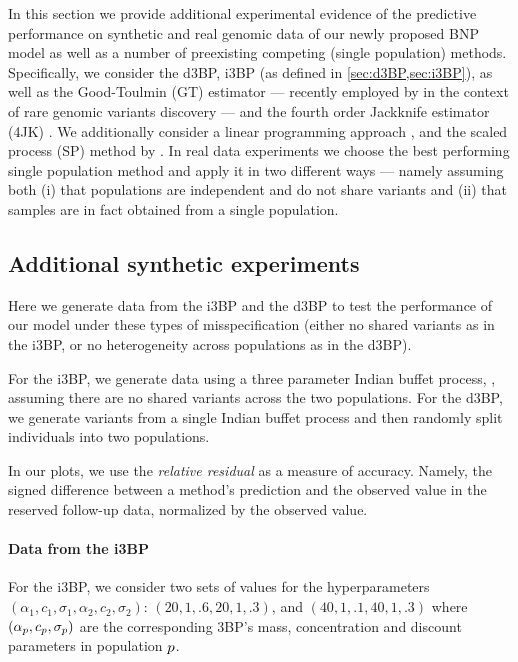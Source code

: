 
In this section we provide additional experimental evidence of the predictive performance on synthetic and real genomic data of our newly proposed BNP model as well as a number of preexisting competing (single population) methods.
Specifically, we consider the d3BP, i3BP (as defined in \cref{sec:d3BP,sec:i3BP}), as well as the Good-Toulmin (GT) estimator --- recently employed by \citet{chakraborty2019using} in the context of rare genomic variants discovery --- and the fourth order Jackknife estimator (4JK) \citet{gravel2014predicting}. We additionally consider a linear programming approach \citep[LP]{zou2016quantifying}, and the scaled process (SP) method by \citet{Camerlenghi2021}. In real data experiments we choose the best performing single population method and apply it in two different ways --- namely assuming both (i) that populations are independent and do not share variants and (ii) that samples are in fact obtained from a single population.

\subsection{Additional synthetic experiments}
\label{sec:misspecified}

Here we generate data from the i3BP and the d3BP to test the performance of our model under these types of misspecification (either no shared variants as in the i3BP, or no heterogeneity across populations as in the d3BP). 

For the i3BP, we generate data using a three parameter Indian buffet process, \citep{Broderick2012, Masoero2022}, assuming there are no shared variants across the two populations. For the d3BP, we generate variants from a single Indian buffet process and then randomly split individuals into two populations. 

In our plots, we use the \emph{relative residual} as a measure of accuracy. Namely, the signed difference between a method’s prediction and the observed value in the reserved follow-up data, normalized by the observed value.


\paragraph{Data from the i3BP}

For the i3BP, we consider two sets of values for the hyperparameters $(\alpha_1,c_1,\sigma_1,\alpha_2,c_2,\sigma_2)$: $(20,1,.6,20,1,.3)$, and   $(40,1,.1,40,1,.3)$ where $(\alpha_p, c_p, \sigma_p)$ are the corresponding 3BP's mass, concentration and discount parameters in population $p$. 

